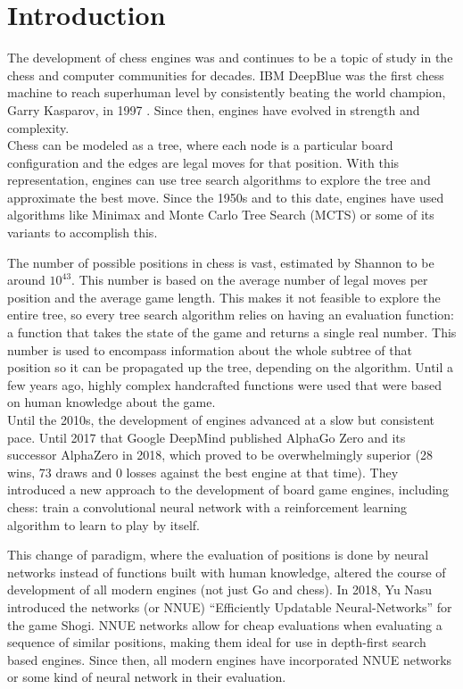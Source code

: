 \section{Introduction}

The development of chess engines was and continues to be a topic of study in the chess and computer communities for decades. IBM DeepBlue \cite{deepblue:2002} was the first chess machine to reach superhuman level by consistently beating the world champion, Garry Kasparov, in 1997 \cite{washingtonpost:1997}. Since then, engines have evolved in strength and complexity. \\

Chess can be modeled as a tree, where each node is a particular board configuration and the edges are legal moves for that position. With this representation, engines can use tree search algorithms to explore the tree and approximate the best move. Since the 1950s and to this date, engines have used algorithms like Minimax \cite{minimax-survey:1995} and Monte Carlo Tree Search \cite{mcts-survey:2012} (MCTS) or some of its variants \cite{tree-search-methods:2014,mcts-modifications:2022} to accomplish this.

The number of possible positions in chess is vast, estimated by Shannon \cite{shannon:1950} to be around $10^{43}$. This number is based on the average number of legal moves per position and the average game length. This makes it not feasible to explore the entire tree, so every tree search algorithm relies on having an evaluation function: a function that takes the state of the game and returns a single real number. This number is used to encompass information about the whole subtree of that position so it can be propagated up the tree, depending on the algorithm. Until a few years ago, highly complex handcrafted functions were used that were based on human knowledge about the game. \\

Until the 2010s, the development of engines advanced at a slow but consistent pace. Until 2017 that Google DeepMind published AlphaGo Zero \cite{alphagozero:2017} and its successor AlphaZero \cite{alphazero:2017,alphazero:2018} in 2018, which proved to be overwhelmingly superior (28 wins, 73 draws and 0 losses against the best engine at that time). They introduced a new approach to the development of board game engines, including chess: train a convolutional neural network with a reinforcement learning algorithm to learn to play by itself.

This change of paradigm, where the evaluation of positions is done by neural networks instead of functions built with human knowledge, altered the course of development of all modern engines (not just Go and chess). In 2018, Yu Nasu introduced the networks  (or NNUE) ``Efficiently Updatable Neural-Networks'' \cite{nnue:2018} for the game Shogi. NNUE networks allow for cheap evaluations when evaluating a sequence of similar positions, making them ideal for use in depth-first search based engines. Since then, all modern engines have incorporated NNUE networks or some kind of neural network in their evaluation.

